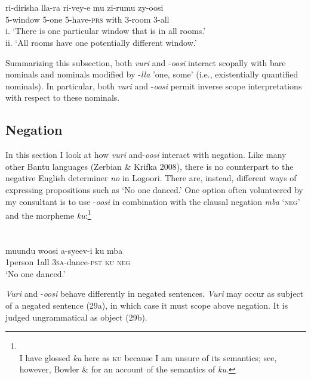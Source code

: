 \documentclass[output=paper]{langsci/langscibook}
\begin{document}
\chapter{}
\gll ri-dirisha   lla-ra   ri-vey-e         mu     zi-rumu  zy-oosi\\
     5-window  5-one   5-have-\textsc{prs    }with   3-room  3-all\\
\glt i. ‘There is one particular window that is in all rooms.’\textit{ }\\
ii. ‘All rooms have one potentially different window.’    \textsc{  }
\z

  Summarizing this subsection, both \textit{vuri }and -\textit{oosi} interact scopally with bare nominals and nominals modified by -\textit{lla} 'one, some' (i.e., existentially quantified nominals). In particular, both \textit{vuri }and -\textit{oosi} permit inverse scope interpretations with respect to these nominals.

\section{Negation}

  In this section I look at how \textit{vuri }and-\textit{oosi} interact with negation. Like many other Bantu languages (Zerbian \& Krifka 2008), there is no counterpart to the negative English determiner \textit{no }in Logoori. There are, instead, different ways of expressing propositions such as ‘No one danced.’ One option often volunteered by my consultant is to use -\textit{oosi} in combination with the clausal negation \textit{mba} ‘\textsc{neg}’\textit{ }and the morpheme \textit{ku}:\footnote{\\
 I have glossed \textit{ku} here as \textsc{ku} because I am unsure of its semantics; see, however, Bowler \& \citet{Gluckman2015} for an account of the semantics of \textit{ku}.}

\chapter[  ]{  }
\gll muundu   woosi  a-syeev-i    ku  mba\\
     1person\textsc{    }1all    3\textsc{sa}{}-dance-\textsc{pst}  \textsc{ku}  \textsc{neg} \\
\glt ‘No one danced.’
\z

  \textit{Vuri} and -\textit{oosi} behave differently in negated sentences. \textit{Vuri }may occur as subject of a negated sentence (29a), in which case it must scope above negation. It is judged ungrammatical as object (29b).
\end{document}
